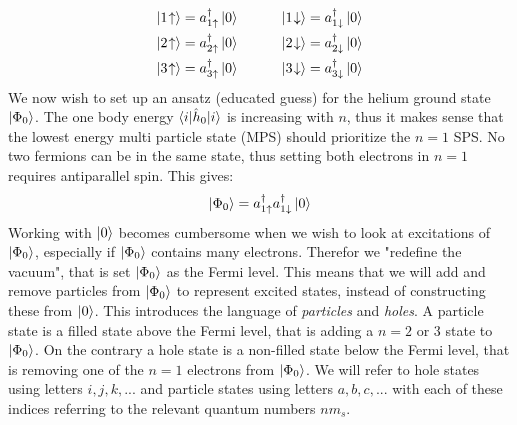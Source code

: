 \documentclass{article}
\newcommand{\vac}{\ket{0}}
\newcommand{\gs}{\ket{\Phi_0}}
\newcommand{\ups}[1]{#1\uparrow}
\newcommand{\downs}[1]{#1\downarrow}
\newcommand{\upst}[1]{#1\hspace{-2px}\uparrow}
\newcommand{\downst}[1]{#1\hspace{-2px}\downarrow}
\newcommand{\inner}[3]{\braket{#1|#2|#3}}
\newcommand{\hnull}{\hat{h}_0}
\newcommand{\crt}[1]{a_{#1}^{\dagger}}
\begin{document}
    \begin{align*}
        \ket{\upst{1}}=\crt{\ups{1}}\vac\hspace{30px}&\ket{\downst{1}}=\crt{\downs{1}}\vac\\
        \ket{\upst{2}}=\crt{\ups{2}}\vac\hspace{30px}&\ket{\downst{2}}=\crt{\downs{2}}\vac\\
        \ket{\upst{3}}=\crt{\ups{3}}\vac\hspace{30px}&\ket{\downst{3}}=\crt{\downs{3}}\vac
    \end{align*}
    We now wish to set up an ansatz (educated guess) for the helium ground state $\gs$. The one body energy $\inner{i}{\hnull}{i}$ is increasing with $n$, thus it makes sense that the lowest energy multi particle state (MPS) should prioritize the $n = 1$ SPS. No two fermions can be in the same state, thus setting both electrons in $n = 1$ requires antiparallel spin. This gives:   
    \begin{align*}
        \gs = \crt{\ups{1}}\crt{\downs{1}}\vac
    \end{align*}
    Working with $\vac$ becomes cumbersome when we wish to look at excitations of $\gs$, especially if $\gs$ contains many electrons. Therefor we "redefine the vacuum", that is set $\gs$ as the Fermi level. This means that we will add and remove particles from $\gs$ to represent excited states, instead of constructing these from $\vac$. This introduces the language of \textit{particles} and \textit{holes}. A particle state is a filled state above the Fermi level, that is adding a $n = 2$ or $3$ state to $\gs$. On the contrary a hole state is a non-filled state below the Fermi level, that is removing one of the $n = 1$ electrons from $\gs$. We will refer to hole states using letters $i,j,k, ...$ and particle states using letters $a,b,c,...$ with each of these indices referring to the relevant quantum numbers $nm_s$. 
    
\end{document}
